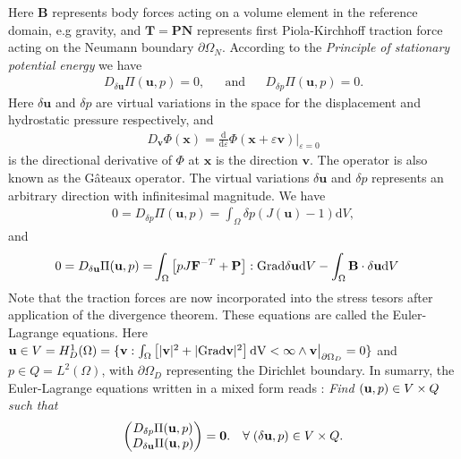 Here $\mathbf{B}$ represents body forces acting on a volume element in
the reference domain, e.g  gravity, and $\mathbf{T} = \mathbf{P}
\mathbf{N}$ represents first Piola-Kirchhoff traction force acting on
the Neumann boundary $\partial \Omega_N$. According to the
\emph{Principle of stationary potential energy} we have  
\begin{align}
  D_{\delta \mathbf{u}} \Pi(\mathbf{u}, p) = 0,  && \text{and} && D_{\delta p} \Pi(\mathbf{u}, p) = 0.
  \label{eq:minimum_potential_energy}
\end{align}
Here $\delta \mathbf{u}$ and $\delta p$ are virtual variations in the
space for the displacement and hydrostatic pressure respectively, and
\begin{align}
  D_{\mathbf{v}} \Phi(\mathbf{x}) = \frac{\mathrm{d}}{\mathrm{d}\varepsilon} \Phi(\mathbf{x} + \varepsilon \mathbf{v})\big|_{\varepsilon = 0}
\end{align}
is the directional derivative of $\Phi$ at $\mathbf{x}$ is the
direction $\mathbf{v}$. The operator is also known as the G\^ateaux
operator. The virtual variations $\delta \mathbf{u}$ and $\delta p$
represents an arbitrary direction with infinitesimal magnitude. We have
\begin{align}
  0 = D_{\delta p} \Pi(\mathbf{u}, p)
  = \int_{\Omega}  \delta p(J(\mathbf{u}) - 1) \mathrm{d}V,
\end{align}
and
\begin{align*}
  \begin{split}
  0 = D_{\delta \mathbf{u}} \Pi(\mathbf{u}, p) 
  =&  \int_{\Omega}  \left[ pJ \mathbf{F}^{-T} + \mathbf{P} \right] : \mathrm{Grad} \delta \mathbf{u} \mathrm{d}V - \int_{\Omega} \mathbf{B} \cdot \delta \mathbf{u} \mathrm{d} V
  \end{split}
\end{align*}
Note that the traction forces are now incorporated into the stress
tesors after application of the divergence theorem. These equations
are called the Euler-Lagrange equations. Here $\mathbf{u}  \in V = 
H_D^1(\Omega) = \{ \mathbf{v}: \int_{\Omega} \left[ |\mathbf{v}|^2 +  |\mathrm{Grad}
\mathbf{v}|^2 \right]\mathrm{dV} < \infty \wedge \mathbf{v}\big|_{\partial
  \Omega_D} = 0\}$ and $p \in Q = L^2(\Omega)$, with $\partial
\Omega_D$ representing the Dirichlet boundary.
In sumarry, the Euler-Lagrange equations written in a mixed form reads
: \emph{Find $(\mathbf{u}, p)\in V \times Q$ such that}
\begin{align}
  \begin{pmatrix}
    D_{\delta p} \Pi(\mathbf{u}, p)\\
    D_{\delta \mathbf{u}} \Pi(\mathbf{u}, p) 
  \end{pmatrix}
  = \mathbf{0}.  && \forall \; (\delta \mathbf{u}, p) \in V \times Q.
\end{align}


